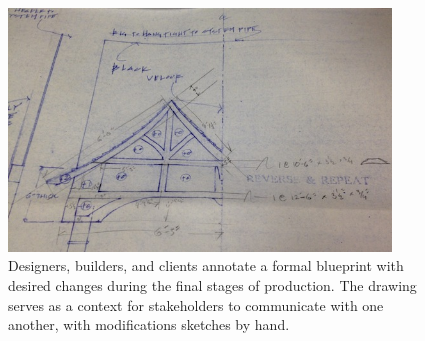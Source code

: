 \begin{figure}[t]
  \centering
  \includegraphics[width=4in]{img/late-phase-hand-annotation.jpg}
  \caption[Annotating a Blueprint]{Designers, builders, and clients
    annotate a formal blueprint with desired changes during the final
    stages of production. The drawing serves as a context for
    stakeholders to communicate with one another, with modifications
    sketches by hand.}
  \label{fig:late-phase-annotate}
\end{figure}
